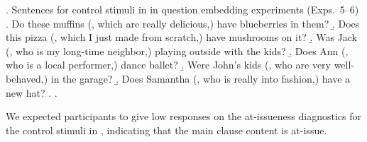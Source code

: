 \documentclass[times,linguex]{glossa}
\begin{document}
\ex. Sentences for control stimuli in in question embedding experiments (Exps.~5--6)
\a. Do these muffins (, which are really delicious,) have blueberries in them?
\b. Does this pizza (, which I just made from scratch,) have mushrooms on it? 
\b. Was Jack (, who is my long-time neighbor,) playing outside with the kids? 
\b. Does Ann (, who is a local performer,) dance ballet?
\b. Were John's kids (, who are very well-behaved,) in the garage?
\b. Does Samantha (, who is really into fashion,) have a new hat?
\z.
\z.

We expected participants to give low responses on the at-issueness diagnostics for the control stimuli in \Last, indicating that the main clause content is at-issue.

\end{document}
